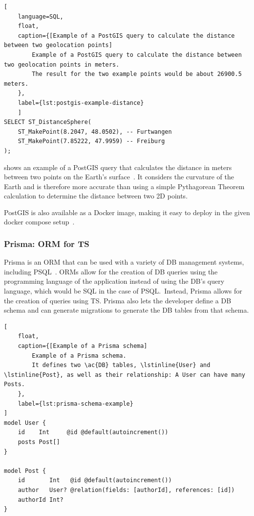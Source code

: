 \begin{lstlisting}[
    language=SQL,
    float,
    caption={[Example of a PostGIS query to calculate the distance between two geolocation points]
        Example of a PostGIS query to calculate the distance between two geolocation points in meters.
        The result for the two example points would be about 26900.5 meters.
    },
    label={lst:postgis-example-distance}
    ]
SELECT ST_DistanceSphere(
    ST_MakePoint(8.2047, 48.0502), -- Furtwangen
    ST_MakePoint(7.85222, 47.9959) -- Freiburg
);
\end{lstlisting}

 shows an example of a PostGIS query that calculates the distance in meters between two points on the Earth's surface~\cite{postgis_psc__osgeo_st_distancesphere_nodate}.
It considers the curvature of the Earth and is therefore more accurate than using a simple Pythagorean Theorem calculation to determine the distance between two 2D points.

PostGIS is also available as a Docker image, making it easy to deploy in the given docker compose setup~\cite{docker_inc_postgispostgis_2023}.

\subsubsection{Prisma: \acl{ORM} for \acl{TS}}

Prisma is an \ac{ORM} that can be used with a variety of \ac{DB} management systems, including \ac{PSQL}~\cite{prisma_data_inc_prisma_2023}.
\acp{ORM} allow for the creation of \ac{DB} queries using the programming language of the application instead of using the \ac{DB}'s query language, which would be \ac{SQL} in the case of \ac{PSQL}.\
Instead, Prisma allows for the creation of queries using \ac{TS}.
Prisma also lets the developer define a \ac{DB} schema and can generate migrations to generate the \ac{DB} tables from that schema.

\begin{lstlisting}[
    float,
    caption={[Example of a Prisma schema]
        Example of a Prisma schema.
        It defines two \ac{DB} tables, \lstinline{User} and \lstinline{Post}, as well as their relationship: A User can have many Posts.
    },
    label={lst:prisma-schema-example}
]
model User {
    id    Int     @id @default(autoincrement())
    posts Post[]
}
    
model Post {
    id       Int   @id @default(autoincrement())
    author   User? @relation(fields: [authorId], references: [id])
    authorId Int?
}
\end{lstlisting}

